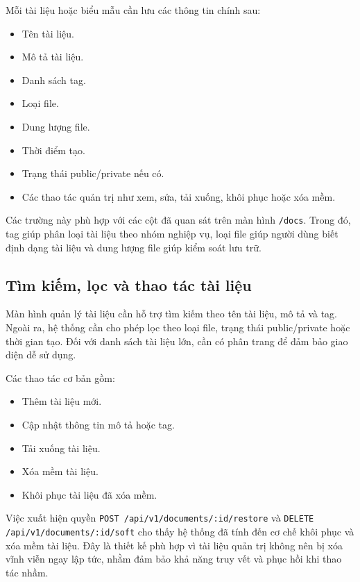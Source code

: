 Mỗi tài liệu hoặc biểu mẫu cần lưu các thông tin chính sau:

\begin{itemize}
    \item Tên tài liệu.
    \item Mô tả tài liệu.
    \item Danh sách tag.
    \item Loại file.
    \item Dung lượng file.
    \item Thời điểm tạo.
    \item Trạng thái public/private nếu có.
    \item Các thao tác quản trị như xem, sửa, tải xuống, khôi phục hoặc xóa mềm.
\end{itemize}

Các trường này phù hợp với các cột đã quan sát trên màn hình \texttt{/docs}. Trong đó, tag giúp phân loại tài liệu theo nhóm nghiệp vụ, loại file giúp người dùng biết định dạng tài liệu và dung lượng file giúp kiểm soát lưu trữ.

\subsection{Tìm kiếm, lọc và thao tác tài liệu}

Màn hình quản lý tài liệu cần hỗ trợ tìm kiếm theo tên tài liệu, mô tả và tag. Ngoài ra, hệ thống cần cho phép lọc theo loại file, trạng thái public/private hoặc thời gian tạo. Đối với danh sách tài liệu lớn, cần có phân trang để đảm bảo giao diện dễ sử dụng.

Các thao tác cơ bản gồm:

\begin{itemize}
    \item Thêm tài liệu mới.
    \item Cập nhật thông tin mô tả hoặc tag.
    \item Tải xuống tài liệu.
    \item Xóa mềm tài liệu.
    \item Khôi phục tài liệu đã xóa mềm.
\end{itemize}

Việc xuất hiện quyền \texttt{POST /api/v1/documents/:id/restore} và \texttt{DELETE /api/v1/documents/:id/soft} cho thấy hệ thống đã tính đến cơ chế khôi phục và xóa mềm tài liệu. Đây là thiết kế phù hợp vì tài liệu quản trị không nên bị xóa vĩnh viễn ngay lập tức, nhằm đảm bảo khả năng truy vết và phục hồi khi thao tác nhầm.

